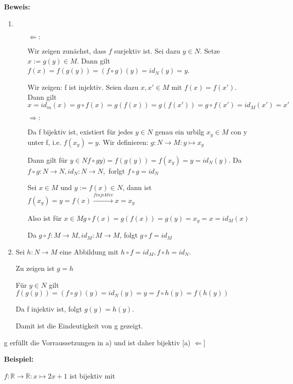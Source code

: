 \documentclass[pdftex,12pt,a4paper,fleqn]{scrartcl}
\begin{document}
\textbf{Beweis:}
\begin{enumerate}[label=\alph*)]
    \item \begin{itemize}
        \item [$\Leftarrow:$]

        Wir zeigen zunächst, dass $f$ surjektiv ist. Sei dazu $y \in N$. Setze $x := g(y) \in M$. Dann gilt $f(x) = f(g(y)) = (f \circ g) (y) = id_N (y) = y$.

        Wir zeigen: f ist injektiv. Seien dazu $x, x' \in M$ mit $f(x) = f(x')$. Dann gilt $x = id_m (x) = g \circ f (x) = g(f(x)) = g(f(x')) = g \circ f (x') = id_M (x') = x'$

        \item [$\Rightarrow:$]

        Da f bijektiv ist, existiert für jedes $y \in N$ genau ein urbilg $x_y \in M$ con y unter f, i.e. $f(x_y)=y$. Wir definieren: $g:N \rightarrow M: y \mapsto x_y$

        Dann gilt für $y \in N f \circ g y) = f(g(y)) = f(x_y) = y = id_N(y) $. Da $ f \circ g: N \rightarrow N, id_N: N \rightarrow N,$ forlgt $f \circ g = id_N$

        Sei $x \in M$ und $y := f(x) \in N$, dann ist $f(x_y) = y = f(x) \xrightarrow{f injektiv} x = x_y$

        Also ist für $x \in M g \circ f (x) = g(f(x)) = g(y) = x_y = x = id_M (x)$

        Da $g \circ f: M \rightarrow M, id_M: M \rightarrow M$, folgt $g \circ f = id_M$
    \end{itemize}
    \item Sei $h: N \rightarrow M$ eine Abbildung mit $h \circ f = id_M, f \circ h = id_N$.

    Zu zeigen ist $g = h$

    Für $y \in N$ gilt $f(g(y)) = (f \circ g) (y) = id_N (y) = y = f \circ h (y) = f(h(y))$

    Da f injektiv ist, folgt $g(y) = h(y)$.

    Damit ist die Eindeutigkeit von g gezeigt.

\end{enumerate}

g erfüllt die Vorraussetzungen in a) und ist daher bijektiv [a) $\Leftarrow$]

\textbf{Beispiel:} 

$f: \mathbb{R} \rightarrow \mathbb{R}: x \mapsto 2x +1$ ist bijektiv mit 
\end{document}
